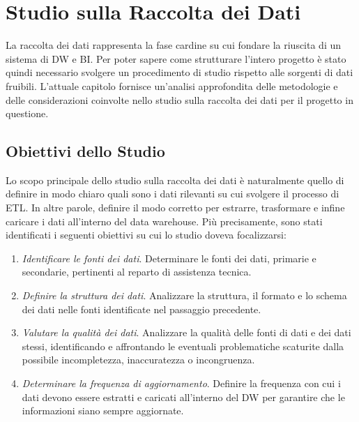 \section{Studio sulla Raccolta dei Dati}

La raccolta dei dati rappresenta la fase cardine su cui fondare la riuscita di un sistema di DW e BI. Per poter sapere come strutturare l'intero progetto è stato quindi necessario svolgere un procedimento di studio rispetto alle sorgenti di dati fruibili. L'attuale capitolo fornisce un'analisi approfondita delle metodologie e delle considerazioni coinvolte nello studio sulla raccolta dei dati per il progetto in questione.

\subsection{Obiettivi dello Studio}

Lo scopo principale dello studio sulla raccolta dei dati è naturalmente quello di definire in modo chiaro quali sono i dati rilevanti su cui svolgere il processo di ETL. In altre parole, definire il modo corretto per estrarre, trasformare e infine caricare i dati all'interno del data warehouse. Più precisamente, sono stati identificati i seguenti obiettivi su cui lo studio doveva focalizzarsi:

\begin{enumerate}
    \item \textit{Identificare le fonti dei dati}. Determinare le fonti dei dati, primarie e secondarie, pertinenti al reparto di assistenza tecnica.
    \item \textit{Definire la struttura dei dati}. Analizzare la struttura, il formato e lo schema dei dati nelle fonti identificate nel passaggio precedente.
    \item \textit{Valutare la qualità dei dati}. Analizzare la qualità delle fonti di dati e dei dati stessi, identificando e affrontando le eventuali problematiche scaturite dalla possibile incompletezza, inaccuratezza o incongruenza.
    \item \textit{Determinare la frequenza di aggiornamento}. Definire la frequenza con cui i dati devono essere estratti e caricati all'interno del DW per garantire che le informazioni siano sempre aggiornate.
\end{enumerate}


